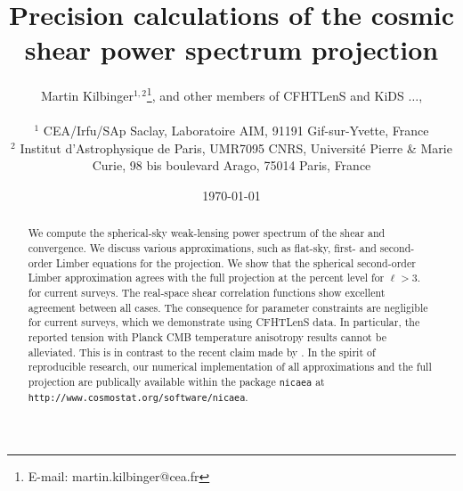 \documentclass[useAMS,usenatbib]{mn2e} %
\begin{document}

\title[]
{Precision calculations of the cosmic shear power spectrum projection}

\author[M.~Kilbinger et~al.]
 {
  \parbox[h]{\textwidth}
  {
      Martin Kilbinger$^{1,2}$\thanks{E-mail: martin.kilbinger@cea.fr},
      and other members of CFHTLenS and KiDS
      $\ldots$,
  }
  \vspace*{10pt} \\
  \hspace{-.1cm}$^1$ CEA/Irfu/SAp Saclay, Laboratoire AIM, 91191 Gif-sur-Yvette, France\\
  \hspace{-.1cm}$^2$ Institut d'Astrophysique de Paris, UMR7095 CNRS,
           Universit\'e Pierre \& Marie Curie, 98 bis boulevard Arago, 75014 Paris,
           France \\
 }

\voffset-0.50in


\date{\today}

\pagerange{\pageref{firstpage}--\pageref{lastpage}} 

\maketitle

\label{firstpage}


\begin{abstract}

We compute the spherical-sky weak-lensing power spectrum of the shear and
convergence. We discuss various approximations, such as flat-sky, first- and
second-order Limber equations for the projection. We show that the spherical
second-order Limber approximation agrees with the full projection at the
percent level for $\ell > 3$. for current surveys. The real-space shear
correlation functions show excellent agreement between all cases. The
consequence for parameter constraints are negligible for current surveys, which
we demonstrate using CFHTLenS data. In particular, the reported tension with
Planck CMB temperature anisotropy results cannot be alleviated. This is in
contrast to the recent claim made by \citet{2016arXiv161104954K}. In the spirit
of reproducible research, our numerical implementation of all approximations
and the full projection are publically available within the package
\texttt{nicaea} at \texttt{http://www.cosmostat.org/software/nicaea}.

\end{abstract}
\end{document}
